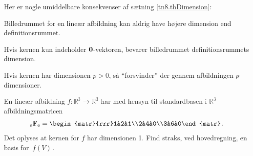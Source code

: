 Her er nogle umiddelbare konsekvenser af sætning \ref{tn8.thDimension}:
\begin{aha}
Billedrummet for en lineær afbildning kan aldrig have højere dimension end definitionsrummet.
\end{aha}
\begin{aha}
Hvis kernen kun indeholder $\bm{0}$-vektoren, bevarer billedrummet definitionsrummets dimension.
\end{aha}
\begin{aha} Hvis kernen har dimensionen $p>0$, så ``forsvinder'' der gennem afbildningen $p$ dimensioner. 
\end{aha}

\begin{exercise}\label{tn8.opgDimension1}
En lineær afbildning $f:\mathbb R^3\rightarrow \mathbb R^3$ har med hensyn til standardbasen i $\mathbb R^3$ afbildningsmatricen
$$\matind eFe =\begin{matr}{rrr}1&2&1\\2&4&0\\3&6&0\end{matr}\,.$$
Det oplyses at kernen for $f$ har dimensionen 1. Find straks, ved hovedregning, en basis for $\,f(V)\,$. 
\end{exercise}

